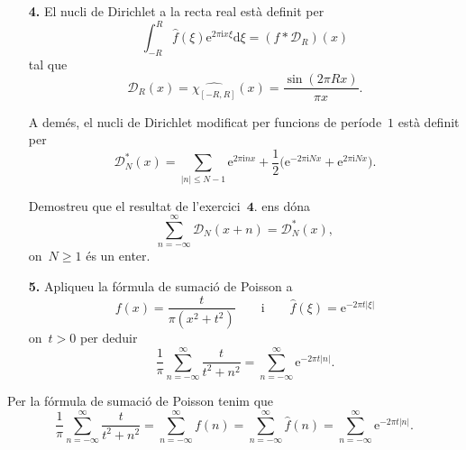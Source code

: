 \documentclass[a4paper]{article}
\theoremstyle{plain}
\newcommand{\iu}{\mathrm{i}}
\newcommand{\e}{\mathrm{e}}
\providecommand{\uppi}{\pi}
\newcommand{\diff}{\mathrm{d}}
\newcommand{\abs}[1]{\lvert{#1}\rvert}
\newcommand{\D}{\mathcal{D}}
\begin{document}
\begin{enumerate}
    \item[\textbf{4.}] El nucli de Dirichlet a la recta real està definit per
        \[
            \int_{-R}^{R}\widehat{f}(\xi)\e^{2\uppi\iu x\xi}\diff\xi
            = (f\ast \D_{R})(x)
        \]
        tal que
        \[
            \D_{R}(x) = \widehat{\chi_{[-R,R]}}(x)
            = \frac{\sin(2\uppi Rx)}{\uppi x}.
        \]

        A demés, el nucli de Dirichlet modificat per funcions de període~\(1\)
        està definit per
        \[
            \D^{\ast}_{N}(x)
            = \sum_{\abs{n} \leq N-1} \e^{2\uppi\iu nx}
            + \frac{1}{2}\bigl(\e^{-2\uppi\iu Nx} + \e^{2\uppi\iu Nx}\bigr).
        \]

        Demostreu que el resultat de l'exercici~\(\textbf{4.}\) ens dóna
        \[
            \sum_{n=-\infty}^{\infty} \D_{N}(x+n) = \D^{\ast}_{N}(x),
        \]
        on~\(N\geq1\) és un enter.
\end{enumerate}

\begin{enumerate}
    \item[\textbf{5.}] Apliqueu la fórmula de sumació de Poisson a
        \[
            f(x) = \frac{t}{\uppi(x^{2}+t^{2})}
            \qquad
            \text{i}
            \qquad
            \widehat{f}(\xi) = \e^{-2\uppi t\abs{\xi}}
        \]
        on~\(t>0\) per deduir
        \[
            \frac{1}{\uppi}
            \sum_{n=-\infty}^{\infty}
            \frac{t}{t^{2}+n^{2}}
            =
            \sum_{n=-\infty}^{\infty}
            \e^{-2\uppi t\abs{n}}.
        \]
\end{enumerate}

Per la fórmula de sumació de Poisson tenim que
\[
    \frac{1}{\uppi}
    \sum_{n=-\infty}^{\infty}
    \frac{t}{t^{2}+n^{2}}
    =
    \sum_{n=-\infty}^{\infty} f(n)
    =
    \sum_{n=-\infty}^{\infty} \widehat{f}(n)
    =
    \sum_{n=-\infty}^{\infty}
    \e^{-2\uppi t\abs{n}}.
\]
\end{document}
